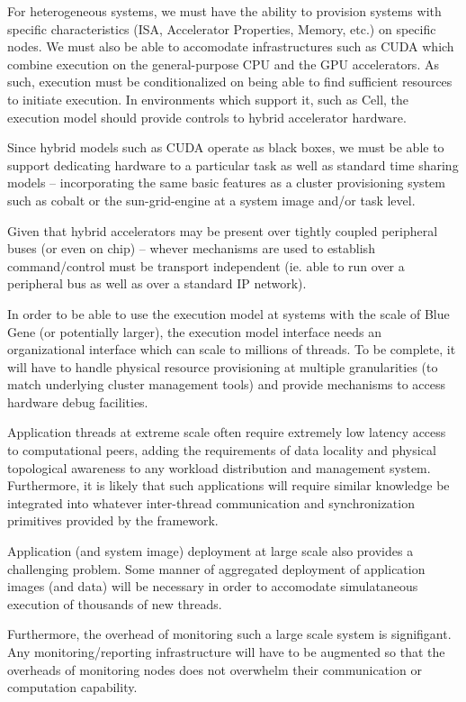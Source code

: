 \documentclass{sig-alternate}
\begin{document}

For heterogeneous systems, we must have the ability to provision systems with
specific characteristics (ISA, Accelerator Properties, Memory, etc.) on
specific nodes.  We must also be able to accomodate infrastructures such as
CUDA which combine execution on the general-purpose CPU and the GPU 
accelerators.   As such, execution must be conditionalized on being able
to find sufficient resources to initiate execution.
In environments which support it, such as Cell, the execution model should 
provide controls to hybrid accelerator hardware.

Since hybrid models such as CUDA operate as black boxes, we must be able
to support dedicating hardware to a particular task as well as standard
time sharing models -- incorporating the same basic features as a 
cluster provisioning system such as cobalt or the sun-grid-engine at
a system image and/or task level.

Given that hybrid accelerators may be present over tightly coupled
peripheral buses (or even on chip) -- whever mechanisms are used to
establish command/control must be transport independent (ie. able to
run over a peripheral bus as well as over a standard IP network).


In order to be able to use the execution model at systems with the
scale of Blue Gene (or potentially larger), the execution model interface
needs an organizational interface which can scale to millions of threads.
To be complete, it will have to handle physical resource provisioning at
multiple granularities (to match underlying cluster management tools) and
provide mechanisms to access hardware debug facilities.

Application threads at extreme scale often require extremely low latency
access to computational peers, adding the requirements of data locality
and physical topological awareness to any workload distribution and
management system.  Furthermore, it is likely that such applications will
require similar knowledge be integrated into whatever inter-thread
communication and synchronization primitives provided by the framework.

Application (and system image) deployment at large scale also provides
a challenging problem.  Some manner of aggregated deployment of application
images (and data) will be necessary in order to accomodate simulataneous
execution of thousands of new threads.

Furthermore, the overhead of monitoring such a large scale system 
is signifigant.  Any monitoring/reporting infrastructure will have to
be augmented so that the overheads of monitoring nodes does not overwhelm
their communication or computation capability.
\end{document}
